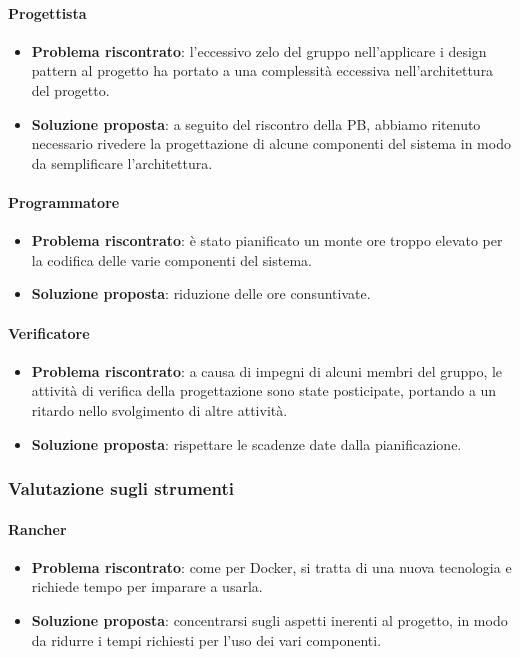        \paragraph{Progettista}
            \begin{itemize}
                \item \textbf{Problema riscontrato}: l'eccessivo zelo del gruppo nell'applicare i design pattern al progetto ha portato a una complessità eccessiva nell'architettura del progetto.
                \item \textbf{Soluzione proposta}: a seguito del riscontro della PB, abbiamo ritenuto necessario rivedere la progettazione di alcune componenti del sistema in modo da semplificare l'architettura.
            \end{itemize}

        \paragraph{Programmatore}
            \begin{itemize}
                \item \textbf{Problema riscontrato}: è stato pianificato un monte ore troppo elevato per la codifica delle varie componenti del sistema.
                \item \textbf{Soluzione proposta}: riduzione delle ore consuntivate.
            \end{itemize}

        \paragraph{Verificatore}
            \begin{itemize}
                \item \textbf{Problema riscontrato}: a causa di impegni di alcuni membri del gruppo, le attività di verifica della progettazione sono state posticipate, portando a un ritardo nello svolgimento di altre attività.
                \item \textbf{Soluzione proposta}: rispettare le scadenze date dalla pianificazione.
            \end{itemize}

    \subsubsection{Valutazione sugli strumenti}

        \paragraph{Rancher}
            \begin{itemize}
                \item \textbf{Problema riscontrato}: come per Docker, si tratta di una nuova tecnologia e richiede tempo per imparare a usarla.
                \item \textbf{Soluzione proposta}: concentrarsi sugli aspetti inerenti al progetto, in modo da ridurre i tempi richiesti per l'uso dei vari componenti.
            \end{itemize}



